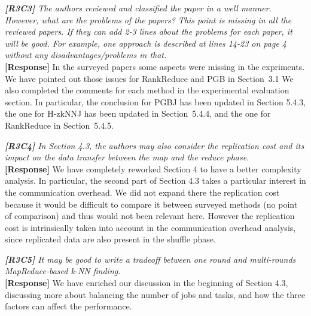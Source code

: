 \documentclass[11pt]{letter}
\newcommand{\svs}{\vspace{0.36ex}}
\newcommand{\TODO}[1]{\textcolor{red}{\textbf{[TODO:#1]}}}
\begin{document}
\svs
\noindent
{\em
{\bf [R3C3]}
 The authors reviewed and classified the paper in a well manner. However, what are the problems of the papers? This 
 point is missing in all the reviewed papers. If they can add 2-3 lines about the problems for each paper, it will be 
 good. For example, one approach is described at lines 14-23 on page 4 without any disadvantages/problems in that.}\\
\textbf{[Response]}
In the surveyed papers some aspects were missing in the expriments. We have pointed out  those issues for RankReduce 
and PGB in Section~3.1
We also completed the comments for each method in the experimental evaluation section. In particular, the conclusion 
for PGBJ has been updated in Section 5.4.3, the one for H-zkNNJ has been updated in Section~5.4.4, and the one for 
RankReduce in Section~5.4.5.


\svs
\noindent
{\em
{\bf [R3C4]}
 In Section 4.3, the authors may also consider the replication cost and its impact on the data transfer between the map 
 and the reduce phase.}\\
\textbf{[Response]}
We have completely reworked Section 4 to have a better complexity analysis. In particular, the second part of Section 4.3 takes a particular interest in the communication overhead. We did not expand there the replication cost because it would be difficult to compare it between surveyed methods (no point of comparison) and thus would not been relevant here. However the replication cost is intrinsically taken into account in the communication overhead analysis, since replicated data are also present in the shuffle phase. 



\svs
\noindent
{\em
{\bf [R3C5]}
 It may be good to write a tradeoff between one round and multi-rounds MapReduce-based k-NN finding.}\\
\textbf{[Response]}
We have enriched our discussion in the beginning of Section 4.3, discussing more about balancing the number of jobs and 
tasks, and how the three factors can affect the performance.
\end{document}
